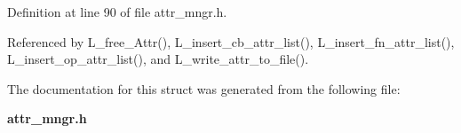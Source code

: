 Definition at line 90 of file attr\_\-mngr.h.

Referenced by L\_\-free\_\-Attr(), L\_\-insert\_\-cb\_\-attr\_\-list(), L\_\-insert\_\-fn\_\-attr\_\-list(), L\_\-insert\_\-op\_\-attr\_\-list(), and L\_\-write\_\-attr\_\-to\_\-file().

The documentation for this struct was generated from the following file:\begin{CompactItemize}
\item 
\bf{attr\_\-mngr.h}\end{CompactItemize}

